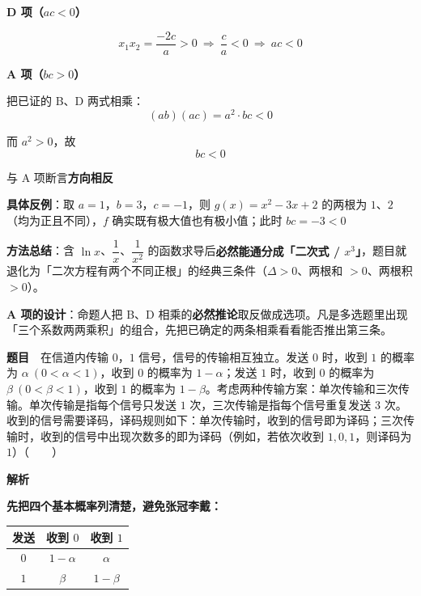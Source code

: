 \textbf{D 项（$ac<0$）}

\[x_1x_2=\frac{-2c}a>0\ \Longrightarrow\ \frac ca<0\ \Longrightarrow\ ac<0\]

\par\medskip

\textbf{A 项（$bc>0$）}

把已证的 B、D 两式相乘：
\[(ab)(ac)=a^{2}\cdot bc<0\]

而 $a^{2}>0$，故
\[bc<0\]

与 A 项断言\textbf{方向相反} 

\textbf{具体反例}：取 $a=1$，$b=3$，$c=-1$，则 $g(x)=x^{2}-3x+2$ 的两根为 $1$、$2$（均为正且不同），$f$ 确实既有极大值也有极小值；此时 $bc=-3<0$ 

\par\medskip


\begin{gktip}
\textbf{方法总结}：含 $\ln x$、$\dfrac1x$、$\dfrac1{x^{2}}$ 的函数求导后\textbf{必然能通分成「二次式 / $x^{3}$」}，题目就退化为「二次方程有两个不同正根」的经典三条件（$\Delta>0$、两根和 $>0$、两根积 $>0$）。

\textbf{A 项的设计}：命题人把 B、D 相乘的\textbf{必然推论}取反做成选项。凡是多选题里出现「三个系数两两乘积」的组合，先把已确定的两条相乘看看能否推出第三条。
\end{gktip}

\par\medskip


\textbf{题目}　在信道内传输 $0$，$1$ 信号，信号的传输相互独立。发送 $0$ 时，收到 $1$ 的概率为 $\alpha\ (0<\alpha<1)$，收到 $0$ 的概率为 $1-\alpha$；发送 $1$ 时，收到 $0$ 的概率为 $\beta\ (0<\beta<1)$，收到 $1$ 的概率为 $1-\beta$。考虑两种传输方案：单次传输和三次传输。单次传输是指每个信号只发送 $1$ 次，三次传输是指每个信号重复发送 $3$ 次。收到的信号需要译码，译码规则如下：单次传输时，收到的信号即为译码；三次传输时，收到的信号中出现次数多的即为译码（例如，若依次收到 $1,0,1$，则译码为 $1$）（　　）

\textbf{解析}

\textbf{先把四个基本概率列清楚，避免张冠李戴：}

\begin{center}
\begin{tabular}{ccc}
\toprule
发送 & 收到 $0$ & 收到 $1$ \\
\midrule
$0$ & $1-\alpha$ & $\alpha$ \\
$1$ & $\beta$ & $1-\beta$ \\
\bottomrule
\end{tabular}
\end{center}

